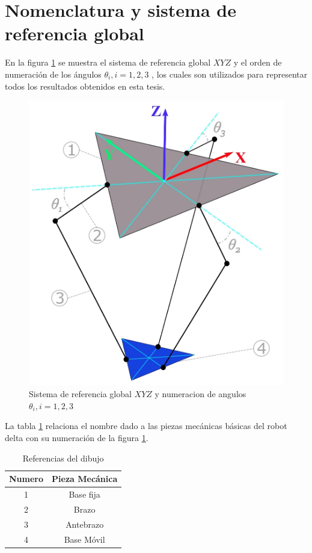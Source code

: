          \newpage


\section{Nomenclatura y sistema de referencia global}
    En la figura \ref{f:ref1} se muestra el sistema de referencia global $XYZ$ y el orden de numeración de los ángulos $\theta_i , i=1,2,3$ , los cuales son utilizados para representar todos los resultados obtenidos en esta tesis. 
    
        \begin{figure}[htb]
             \centering
             \includegraphics[width=0.75\linewidth]{Main/Chapter4/Images4/DIBUJO1.jpg}
              \caption{Sistema de referencia global $XYZ$ y numeracion de angulos $\theta_i , i=1,2,3$ }
              \label{f:ref1}
        \end{figure}

La tabla \ref{tab:cap4_tabla_00} relaciona el nombre dado a las piezas mecánicas básicas del robot delta con su numeración de la figura \ref{f:ref1}.
        \begin{table}[h]
            \centering
            \begin{tabular}{c c}
            \hline
                \textbf{Numero}& \textbf{Pieza Mecánica} \\ 
            \hline             \hline
             1 & Base fija \\
            \hline
             2 & Brazo \\
            \hline
             3 & Antebrazo \\
            \hline
             4 & Base Móvil\\
            \hline
            \end{tabular}
           \caption{Referencias del dibujo}
           \label{tab:cap4_tabla_00}
        \end{table}
        
